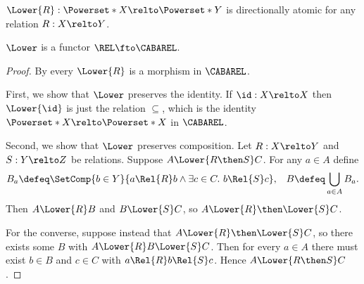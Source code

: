 \documentclass[a4paper,UKenglish,cleveref, autoref]{lipics-v2021}
\begin{document}
\begin{lemma}\label{lemma:lower-then-cabarel}
   \(\Lower{R} : \Powerset*{X} \relto \Powerset*{Y}\) is directionally atomic
   for any relation \(R : X \relto Y\).
\end{lemma}
%
%
%

\begin{lemma}\label{lemma:lower-functor}
  \(\Lower\) is a functor \(\REL \fto \CABAREL\).
\end{lemma}
\begin{proof}

  By  every \(\Lower{R}\) is a morphism in
  \(\CABAREL\).

  First, we show that \(\Lower\) preserves the identity. If \(\id : X \relto X\)
  then \(\Lower{\id}\) is just the relation \(\subseteq\), which is the identity
  \(\Powerset*{X} \relto \Powerset*{X}\) in \(\CABAREL\).

  Second, we show that \(\Lower\) preserves composition. Let \(R : X \relto Y\)
  and \(S : Y \relto Z\) be relations. Suppose \(A \Lower{R \then S} C\). For
  any \(a \in A\) define
  \begin{align*}
    B_a \defeq
    \SetComp{b \in Y}{a \Rel{R} b \wedge \exists c \in C.\ b \Rel{S} c},
    &&
       B \defeq \bigcup_{a \in A} B_a.
  \end{align*}
  Then $A \Lower{R} B$ and $B \Lower{S} C$, so
  \(A \Lower{R} \then \Lower{S} C\).

  For the converse, suppose instead that \(A \Lower{R} \then \Lower{S} C\), so
  there exists some \(B\) with \(A \Lower{R} B \Lower{S} C\). Then for every
  \(a \in A\) there must exist \(b \in B\) and \(c \in C\) with
  \(a \Rel{R} b \Rel{S} c\). Hence \(A \Lower{R \then S} C\).
\end{proof}
\end{document}
